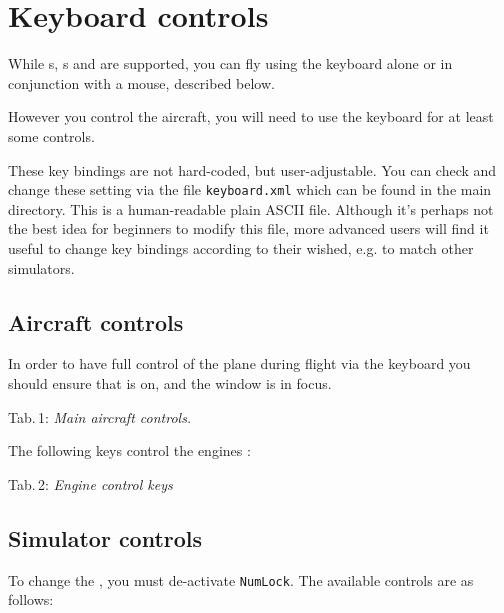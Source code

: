 \section{Keyboard controls}

While s, s and  are supported,
you can fly \FlightGear{} using the keyboard alone or in conjunction with a mouse,
described below.

However you control the aircraft, you will need to use the keyboard for at least some controls.

These key bindings are not hard-coded, but
user-adjustable. You can check and change these setting via the file
\texttt{keyboard.xml} which can be found in the main
\FlightGear{} directory. This is a human-readable plain ASCII file.
Although it's perhaps not the best idea for beginners to modify this file,
more advanced users will find it useful to change key bindings according to
their wished, e.g. to match other simulators.

\subsection{Aircraft controls}

In order to have full control of the plane during flight via the keyboard you should ensure that
\texttt{} is on, and the \FlightGear{} window is in focus.

\medskip
\centerline{}
Tab.\,1: \textit{Main aircraft controls.}
\medskip

The following keys control the engines :

\medskip
\centerline{}
Tab.\,2: \textit{Engine control keys}
\medskip

\subsection{Simulator controls}

To change the , you must de-activate \texttt{NumLock}. The available controls are as follows:
\medskip


